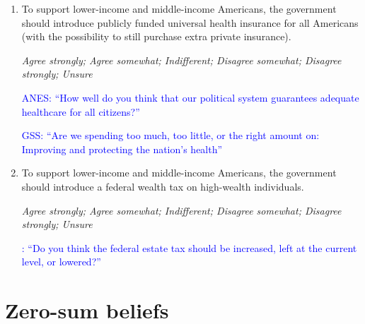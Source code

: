 \documentclass[11pt, headsepline]{article}
\newcommand{\blue}[1]{\textcolor{blue}{#1}}
\begin{document}
\begin{enumerate}[resume]
    \textit{Agree strongly; Agree somewhat; Indifferent; Disagree somewhat; Disagree strongly; Unsure}

    \blue{ANES: ``Some people think the government should provide fewer services even in areas such as health and education in order to reduce spending. Suppose these people are at one end of a scale, at point 1. Other people feel it is important for the government to provide many more services even if it means an increase in spending. Suppose these people are at the other end, at point 7.''}

    \blue{\cite{stantcheva2021understanding}: ``What do you think would ultimately do more to reduce the income differences between poor and rich families? \textit{Lowering taxes on wealthy people/women and corporations to encourage more investment in economic growth.; Raising taxes on wealthy people/women and corporations to expand programs for the poor.}''}

    \item To support lower-income and middle-income Americans, the government should introduce publicly funded universal health insurance for all Americans (with the possibility to still purchase extra private insurance).

    \textit{Agree strongly; Agree somewhat; Indifferent; Disagree somewhat; Disagree strongly; Unsure}

    \blue{ANES: ``How well do you think that our political system guarantees adequate healthcare for all citizens?''}

    \blue{GSS: ``Are we spending too much, too little, or the right amount on: Improving and protecting the nation's health''}

    \item To support lower-income and middle-income Americans, the government should introduce a federal wealth tax on high-wealth individuals.

    \textit{Agree strongly; Agree somewhat; Indifferent; Disagree somewhat; Disagree strongly; Unsure}

    \blue{\cite{stantcheva2021understanding}: ``Do you think the federal estate tax should be increased, left at the current level, or lowered?''}
    
\end{enumerate}

\section*{Zero-sum beliefs}
\end{document}
